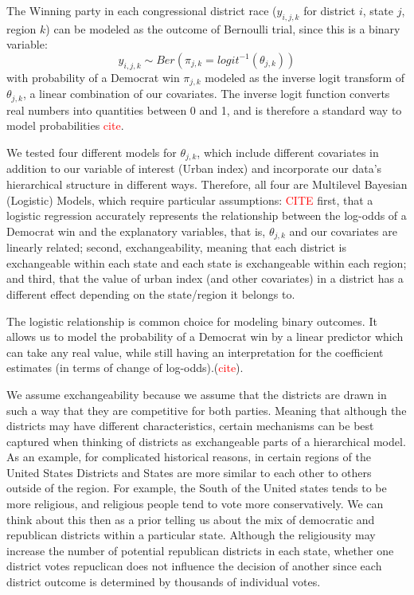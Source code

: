 \documentclass[12pt]{article}
\begin{document}
The Winning party in each congressional district race ($y_{i,j,k}$ for district $i$, state $j$, region $k$) can be modeled as the outcome of Bernoulli trial, since this is a binary variable: 
\begin{equation}
	y_{i,j,k} \sim Ber \left( \pi_{j,k} = logit^{-1}(\theta_{j,k})  \right)
\end{equation}
with probability of a Democrat win $\pi_{j,k}$ modeled as the inverse logit transform of $\theta_{j,k}$, a linear combination of our covariates. The inverse logit function converts real numbers into quantities between 0 and 1, and is therefore a standard way to model probabilities \parencite{logitlink} \textcolor{red}{cite}.


We tested four different models for $\theta_{j,k}$, which include different covariates in addition to our variable of interest (Urban index) and incorporate our data's hierarchical structure in different ways. Therefore, all four are Multilevel Bayesian (Logistic) Models, which require particular assumptions: \textcolor{red}{CITE} 
first, that a logistic regression accurately represents the relationship between the log-odds of a Democrat win and the explanatory variables, that is, $\theta_{j,k}$ and our covariates are linearly related; second, exchangeability, meaning that each district is exchangeable within each state and each state is exchangeable within each region; and third, that the value of urban index (and other covariates) in a district has a different effect depending on the state/region it belongs to.


The logistic relationship is common choice for modeling binary outcomes. It allows us to model the probability of a Democrat win by a linear predictor which can take any real value, while still having an interpretation for the coefficient estimates (in terms of change of log-odds).(\textcolor{red}{cite}).


We assume exchangeability because we assume that the districts are drawn in such a way that they are competitive for both parties. Meaning that although the districts may have different characteristics, certain mechanisms can be best captured when thinking of districts as exchangeable parts of  a hierarchical model. 
As an example, for complicated historical reasons, in certain regions of the United States Districts and States are more similar to each other to others outside of the region. For example, the South of the United states tends to be more religious, and religious people tend to vote more conservatively. We can think about this then as a prior telling us about the mix of democratic and republican districts within a particular state. Although the religiousity may increase the number of potential republican districts in each state, whether one district votes repuclican does not influence the decision of another since each district outcome is determined by thousands of individual votes. 
\end{document}
